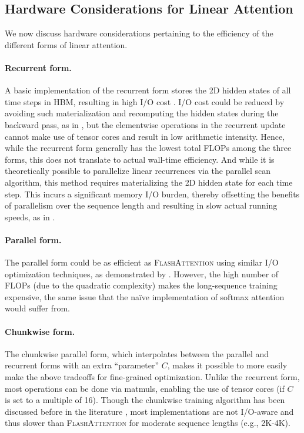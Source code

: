 \vspace{-2mm}
\subsection{Hardware Considerations for Linear Attention}
\vspace{-2mm}
We now discuss hardware considerations pertaining to the efficiency of the different forms of linear attention.  

\vspace{-2mm}
\paragraph{Recurrent form.}  A basic implementation of the recurrent form  stores the 2D hidden states of all time steps in HBM, resulting in  high I/O cost \cite{mao-2022-fine}. I/O cost could be reduced by avoiding such materialization and recomputing the hidden states during the backward pass, as in \citet{katharopoulos2020transformers}, but the elementwise operations in the recurrent update cannot make use of tensor cores and result in low arithmetic intensity. Hence, while the recurrent form generally has the lowest total FLOPs among the three forms, this does not translate to actual wall-time efficiency.  And while it is theoretically possible to parallelize  linear recurrences via the parallel scan algorithm, this method requires materializing the 2D hidden state for each time step. This  incurs a significant memory I/O burden, thereby offsetting the benefits of parallelism over the sequence length and resulting in slow actual running speeds, as in 
 \citet{gatedloop}. 

\vspace{-2mm}
\paragraph{Parallel form.} The parallel form could be as efficient as \textsc{FlashAttention} using similar I/O optimization techniques, as demonstrated by \citet{qin2023scaling}. However, the high number of FLOPs (due to the quadratic complexity) makes the long-sequence training expensive, the same issue that the na\"ive implementation of softmax attention would suffer from. %

\vspace{-2mm}
\paragraph{Chunkwise form.} The chunkwise parallel form, which interpolates between the parallel and recurrent forms with an extra ``parameter'' $C$, makes it possible to more easily make the above tradeoffs for fine-grained  optimization. 
Unlike the recurrent form, most operations can be done via matmuls, enabling the use of tensor cores (if $C$ is set to a multiple of 16). 
Though the chunkwise training algorithm has been discussed before in the literature \cite{GAU, sun2023retentive}, most implementations are not I/O-aware and thus slower than \textsc{FlashAttention} for moderate sequence lengths (e.g., 2K-4K). 

